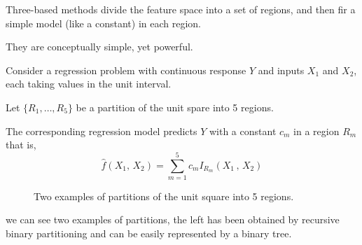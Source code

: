 Three-based methods divide the feature space into a set of regions,
and then fir a simple model (like a constant) in each region.

They are conceptually simple, yet powerful.

\begin{example}{}{}
	Consider a regression problem with continuous response $Y$ and
	inputs $X_1$ and $X_2$, each taking values in the unit interval.

	Let $\{R_1,\dots,R_5\}$ be a partition of the unit spare into 5 regions.

	The corresponding regression model predicts $Y$ with a constant
	$c_m$ in a region $R_m$ that is,
	\begin{equation*}
		\hat{f}(X_1,\,X_2) = \sum_{m=1}^5 c_m I_{R_m}(X_1\,,\,X_2)
	\end{equation*}

	\begin{figure}[H]
		\hfill
		\caption{Two examples of partitions of the unit square into 5 regions.}%
		\label{fig:cart}
	\end{figure}

	 we can see two examples of partitions, the left has been obtained
	by recursive binary partitioning and can be easily represented by a binary tree.


\end{example}

